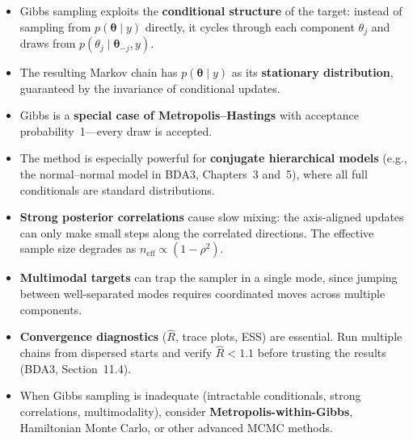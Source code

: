 \documentclass[11pt]{article}
\begin{document}
\begin{itemize}
  \item Gibbs sampling exploits the \textbf{conditional structure} of the target: instead of sampling from $p(\boldsymbol{\theta} \mid y)$ directly, it cycles through each component $\theta_j$ and draws from $p(\theta_j \mid \boldsymbol{\theta}_{-j}, y)$.
  \item The resulting Markov chain has $p(\boldsymbol{\theta} \mid y)$ as its \textbf{stationary distribution}, guaranteed by the invariance of conditional updates.
  \item Gibbs is a \textbf{special case of Metropolis--Hastings} with acceptance probability~1---every draw is accepted.
  \item The method is especially powerful for \textbf{conjugate hierarchical models} (e.g., the normal--normal model in BDA3, Chapters~3 and~5), where all full conditionals are standard distributions.
  \item \textbf{Strong posterior correlations} cause slow mixing: the axis-aligned updates can only make small steps along the correlated directions.  The effective sample size degrades as $n_{\text{eff}} \propto (1-\rho^2)$.
  \item \textbf{Multimodal targets} can trap the sampler in a single mode, since jumping between well-separated modes requires coordinated moves across multiple components.
  \item \textbf{Convergence diagnostics} ($\hat{R}$, trace plots, ESS) are essential.  Run multiple chains from dispersed starts and verify $\hat{R} < 1.1$ before trusting the results (BDA3, Section~11.4).
  \item When Gibbs sampling is inadequate (intractable conditionals, strong correlations, multimodality), consider \textbf{Metropolis-within-Gibbs}, Hamiltonian Monte Carlo, or other advanced MCMC methods.
\end{itemize}
\end{document}
